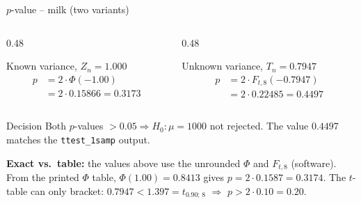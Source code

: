\documentclass[aspectratio=169,11pt]{beamer}
\begin{document}
\begin{frame}{$p$-value -- milk (two variants)}
  \begin{columns}[T]
    \begin{column}{0.48\textwidth}
      \begin{block}{Known variance, $Z_n=1.000$}
        \begin{align*}
          p &= 2\cdot\Phi(-1.00)\\
            &= 2\cdot 0.15866 = 0.3173
        \end{align*}
      \end{block}
    \end{column}
    \begin{column}{0.48\textwidth}
      \begin{block}{Unknown variance, $T_n=0.7947$}
        \begin{align*}
          p &= 2\cdot F_{t,8}(-0.7947)\\
            &= 2\cdot 0.22485 = 0.4497
        \end{align*}
      \end{block}
    \end{column}
  \end{columns}
  \begin{exampleblock}{Decision}
    Both $p$-values $> 0.05 \Rightarrow H_0:\mu=1000$ not rejected.
    The value $0.4497$ matches the \texttt{ttest\_1samp} output.
  \end{exampleblock}
  \footnotesize\textbf{Exact vs.\ table:} the values above use the unrounded
  $\Phi$ and $F_{t,8}$ (software). From the printed $\Phi$ table,
  $\Phi(1.00)=0.8413$ gives $p=2\cdot0.1587=0.3174$. The $t$-table can only
  bracket: $0.7947<1.397=t_{0.90;\,8}$ $\Rightarrow$ $p>2\cdot0.10=0.20$.
\end{frame}
\end{document}
